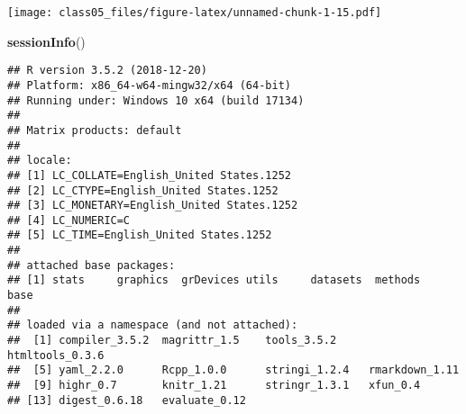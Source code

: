 \documentclass[]{article}
\newenvironment{Shaded}{\begin{snugshade}}{\end{snugshade}}
\newcommand{\KeywordTok}[1]{\textcolor[rgb]{0.13,0.29,0.53}{\textbf{#1}}}
\newcommand{\NormalTok}[1]{#1}
\begin{document}
\texttt{[image: class05\_files/figure-latex/unnamed-chunk-1-15.pdf]}

\begin{Shaded}
\begin{Highlighting}[]
\KeywordTok{sessionInfo}\NormalTok{()}
\end{Highlighting}
\end{Shaded}

\begin{verbatim}
## R version 3.5.2 (2018-12-20)
## Platform: x86_64-w64-mingw32/x64 (64-bit)
## Running under: Windows 10 x64 (build 17134)
## 
## Matrix products: default
## 
## locale:
## [1] LC_COLLATE=English_United States.1252 
## [2] LC_CTYPE=English_United States.1252   
## [3] LC_MONETARY=English_United States.1252
## [4] LC_NUMERIC=C                          
## [5] LC_TIME=English_United States.1252    
## 
## attached base packages:
## [1] stats     graphics  grDevices utils     datasets  methods   base     
## 
## loaded via a namespace (and not attached):
##  [1] compiler_3.5.2  magrittr_1.5    tools_3.5.2     htmltools_0.3.6
##  [5] yaml_2.2.0      Rcpp_1.0.0      stringi_1.2.4   rmarkdown_1.11 
##  [9] highr_0.7       knitr_1.21      stringr_1.3.1   xfun_0.4       
## [13] digest_0.6.18   evaluate_0.12
\end{verbatim}
\end{document}
